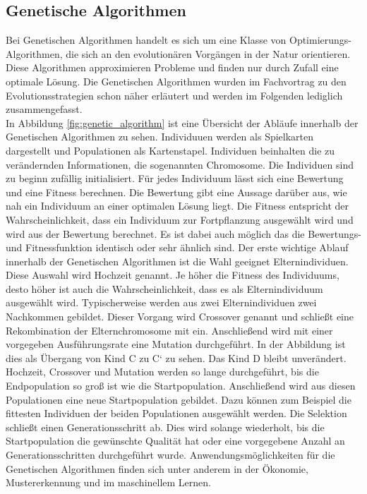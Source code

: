 \subsection{Genetische Algorithmen}
Bei Genetischen Algorithmen handelt es sich um eine Klasse von Optimierungs-Algorithmen, die sich an den evolutionären Vorgängen in der Natur orientieren. Diese Algorithmen approximieren Probleme und finden nur durch Zufall eine optimale Lösung.
Die Genetischen Algorithmen wurden im Fachvortrag zu den Evolutionsstrategien schon näher erläutert und werden im Folgenden lediglich zusammengefasst.\\
In Abbildung \ref{fig:genetic_algorithm} ist eine Übersicht der Abläufe innerhalb der Genetischen Algorithmen zu sehen. Individuuen werden als Spielkarten dargestellt und Populationen als Kartenstapel. Individuen beinhalten die zu verändernden Informationen, die sogenannten Chromosome. Die Individuen sind zu beginn zufällig initialisiert.
Für jedes Individuum lässt sich eine Bewertung und eine Fitness berechnen. Die Bewertung gibt eine Aussage darüber aus, wie nah ein Individuum an einer optimalen Lösung liegt.
Die Fitness entspricht der Wahrscheinlichkeit, dass ein Individuum zur Fortpflanzung ausgewählt wird und wird aus der Bewertung berechnet. Es ist dabei auch möglich das die Bewertungs- und Fitnessfunktion identisch oder sehr ähnlich sind.
Der erste wichtige Ablauf innerhalb der Genetischen Algorithmen ist die Wahl geeignet Elternindividuen. Diese Auswahl wird Hochzeit genannt. Je höher die Fitness des Individuums, desto höher ist auch die Wahrscheinlichkeit, dass es als Elternindividuum ausgewählt wird.
Typischerweise werden aus zwei Elternindividuen zwei Nachkommen gebildet. Dieser Vorgang wird Crossover genannt und schließt eine Rekombination der Elternchromosome mit ein. Anschließend wird mit einer vorgegeben Ausführungsrate eine Mutation durchgeführt. In der Abbildung ist dies als Übergang von Kind C zu C` zu sehen. Das Kind D bleibt unverändert.
Hochzeit, Crossover und Mutation werden so lange durchgeführt, bis die Endpopulation so groß ist wie die Startpopulation. Anschließend wird aus diesen Populationen eine neue Startpopulation gebildet. Dazu können zum Beispiel die fittesten Individuen der beiden Populationen ausgewählt werden.
Die Selektion schließt einen Generationsschritt ab. Dies wird solange wiederholt, bis die Startpopulation die gewünschte Qualität hat oder eine vorgegebene Anzahl an Generationsschritten durchgeführt wurde.
Anwendungsmöglichkeiten für die Genetischen Algorithmen finden sich unter anderem in der Ökonomie, Mustererkennung und im maschinellem Lernen.

